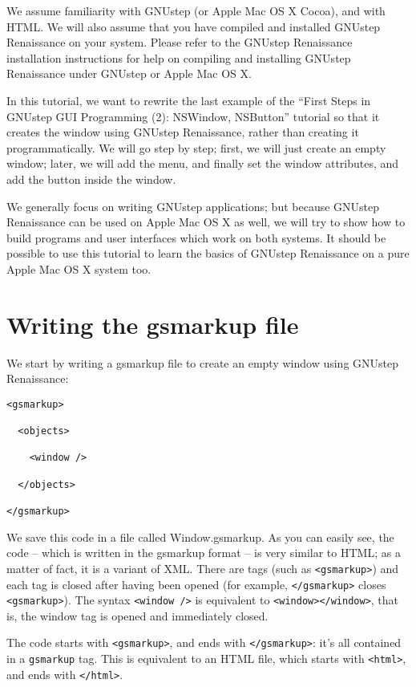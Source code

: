 \documentclass[a4paper]{article}
\begin{document}
We assume familiarity with GNUstep (or Apple Mac OS X Cocoa), and with
HTML.  We will also assume that you have compiled and installed
GNUstep Renaissance on your system.  Please refer to the GNUstep
Renaissance installation instructions for help on compiling and
installing GNUstep Renaissance under GNUstep or Apple Mac OS X.

In this tutorial, we want to rewrite the last example of the ``First
Steps in GNUstep GUI Programming (2): NSWindow, NSButton'' tutorial so
that it creates the window using GNUstep Renaissance, rather than
creating it programmatically.  We will go step by step; first, we will
just create an empty window; later, we will add the menu, and finally
set the window attributes, and add the button inside the window.

We generally focus on writing GNUstep applications; but because
GNUstep Renaissance can be used on Apple Mac OS X as well, we will try to
show how to build programs and user interfaces which work on both
systems.  It should be possible to use this tutorial to learn the
basics of GNUstep Renaissance on a pure Apple Mac OS X system too.

\section{Writing the gsmarkup file}
We start by writing a gsmarkup file to create an empty window using
GNUstep Renaissance:
\begin{verbatim}
<gsmarkup>

  <objects>

    <window />

  </objects>

</gsmarkup>
\end{verbatim}
We save this code in a file called Window.gsmarkup.  As you can easily
see, the code -- which is written in the gsmarkup format -- is very
similar to HTML; as a matter of fact, it is a variant of XML.  There
are tags (such as \texttt{<gsmarkup>}) and each tag is closed after
having been opened (for example, \texttt{</gsmarkup>} closes
\texttt{<gsmarkup>}).  The syntax \texttt{<window />} is equivalent
to \texttt{<window></window>}, that is, the window tag is opened and
immediately closed.

The code starts with \texttt{<gsmarkup>}, and ends with
\texttt{</gsmarkup>}: it's all contained in a \texttt{gsmarkup} tag. 
This is equivalent to an HTML file, which starts with \texttt{<html>},
and ends with \texttt{</html>}.
\end{document}
